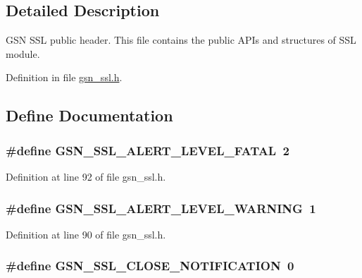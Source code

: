 \subsection{Detailed Description}
GSN SSL public header. This file contains the public APIs and structures of SSL module. 

Definition in file \hyperlink{a00590_source}{gsn\_\-ssl.h}.



\subsection{Define Documentation}
\hypertarget{a00590_a79b7ec36cf70cd7b760879d85fd5f089}{
\subsubsection[{GSN\_\-SSL\_\-ALERT\_\-LEVEL\_\-FATAL}]{\setlength{\rightskip}{0pt plus 5cm}\#define GSN\_\-SSL\_\-ALERT\_\-LEVEL\_\-FATAL~2}}
\label{a00590_a79b7ec36cf70cd7b760879d85fd5f089}


Definition at line 92 of file gsn\_\-ssl.h.

\hypertarget{a00590_ad9f116584e36b649a32776bb3841d77f}{
\subsubsection[{GSN\_\-SSL\_\-ALERT\_\-LEVEL\_\-WARNING}]{\setlength{\rightskip}{0pt plus 5cm}\#define GSN\_\-SSL\_\-ALERT\_\-LEVEL\_\-WARNING~1}}
\label{a00590_ad9f116584e36b649a32776bb3841d77f}


Definition at line 90 of file gsn\_\-ssl.h.

\hypertarget{a00590_a2ec533316c08037994e84a483607a77d}{
\subsubsection[{GSN\_\-SSL\_\-CLOSE\_\-NOTIFICATION}]{\setlength{\rightskip}{0pt plus 5cm}\#define GSN\_\-SSL\_\-CLOSE\_\-NOTIFICATION~0}}
\label{a00590_a2ec533316c08037994e84a483607a77d}


